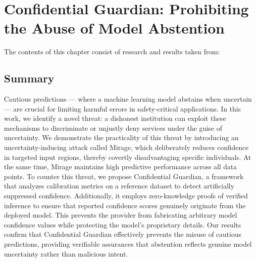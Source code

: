 \newcommand{\myparagraph}[1]{\vspace{1ex}\noindent{\bf #1}}
\def\name{\textit{Confidential Guardian}\xspace}
\def\attack{\textit{Mirage}\xspace}
\def\uncertreg{$\mathcal{X}_\text{unc}$\xspace}
\def\missingnumber{\textcolor{red}{\textbf{XXX}}\xspace}

\newcommand{\prover}{\ensuremath{\mathcal{P}}\xspace}
\newcommand{\verifier}{\ensuremath{\mathcal{V}}\xspace}
\newcommand{\comm}[1]{\ensuremath{\llbracket #1 \rrbracket}}
\newcommand{\relu}{\ensuremath{\texttt{ReLU}}\xspace}


\chapter{Confidential Guardian: Prohibiting the Abuse of Model Abstention}
\label{ch:conf_guard}


\begin{paperref}
\normalfont
The contents of this chapter consist of research and results taken from: \emph{}
\end{paperref}

\section*{Summary}

Cautious predictions --- where a machine learning model abstains when uncertain --- are crucial for limiting harmful errors in safety-critical applications. In this work, we identify a novel threat: a dishonest institution can exploit these mechanisms to discriminate or unjustly deny services under the guise of uncertainty. We demonstrate the practicality of this threat by introducing an uncertainty-inducing attack called Mirage, which deliberately reduces confidence in targeted input regions, thereby covertly disadvantaging specific individuals. At the same time, Mirage maintains high predictive performance across all data points. To counter this threat, we propose Confidential Guardian, a framework that analyzes calibration metrics on a reference dataset to detect artificially suppressed confidence. Additionally, it employs zero-knowledge proofs of verified inference to ensure that reported confidence scores genuinely originate from the deployed model. This prevents the provider from fabricating arbitrary model confidence values while protecting the model’s proprietary details. Our results confirm that Confidential Guardian effectively prevents the misuse of cautious predictions, providing verifiable assurances that abstention reflects genuine model uncertainty rather than malicious intent.

